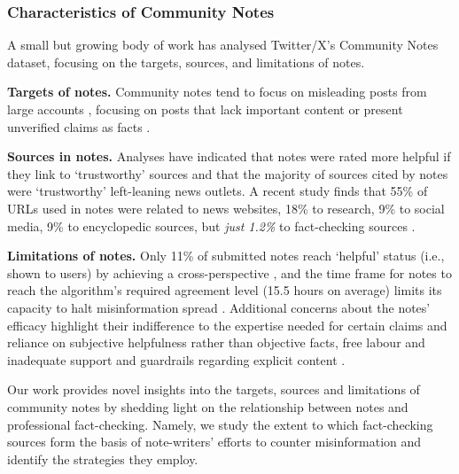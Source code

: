 \subsubsection{Characteristics of Community Notes}

A small but growing body of work has analysed Twitter/X's Community Notes dataset, focusing on the targets, sources, and limitations of notes. 

\noindent \textbf{Targets of notes.}
Community notes tend to focus on misleading posts from large accounts %
\citep{pilarski_community_2024}, focusing on posts that lack important content or present unverified claims as facts \citep{prollochs2022community,drolsbach_diffusion_2023}. 

\noindent \textbf{Sources in notes.}
Analyses have indicated that notes were rated more helpful if they link to `trustworthy' sources \citep{prollochs2022community} and that the majority of sources cited by notes were `trustworthy'
left-leaning news outlets. %
A recent study finds that 55\% of URLs used in notes were related to news websites, 18\% to research, 9\% to social media, 9\% to encyclopedic sources, but \textit{just 1.2\%} to fact-checking sources \citep{kangur_who_2024}.

\noindent \textbf{Limitations of notes.}
Only 11\% of submitted notes reach `helpful' status (i.e., shown to users) by achieving a cross-perspective \citep{renault_collaboratively_2024, wirtschafter2023future}, and the time frame for notes to reach the algorithm's required agreement level (15.5 hours on average) limits its capacity to halt misinformation spread \citep{renault_collaboratively_2024}.
Additional concerns about the notes' efficacy highlight their indifference to the expertise needed for certain claims and reliance on subjective helpfulness rather than objective facts, free labour and inadequate support and guardrails regarding explicit content \citep{Gilbert_2025}. 

Our work provides novel insights into the targets, sources and limitations of community notes by shedding light on the relationship between notes and professional fact-checking. Namely, we study the extent to which fact-checking sources form the basis of note-writers' efforts to counter misinformation and identify the strategies they employ. 

